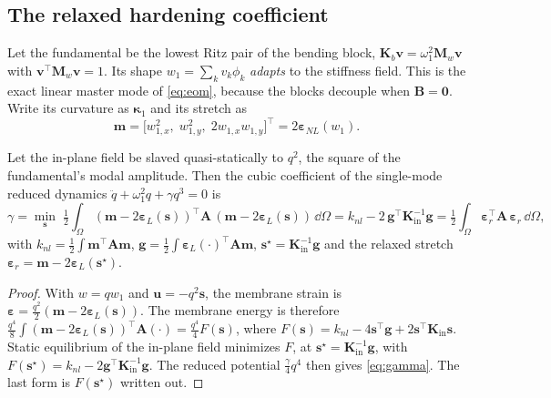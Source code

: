 \subsection{The relaxed hardening coefficient}\label{sec:relaxed}
Let the fundamental be the lowest Ritz pair of the bending block,
$\bm K_b\bm v=\omega_1^2\bm M_w\bm v$ with $\bm v^{\!\top}\bm M_w\bm v=1$. Its shape
$w_1=\sum_kv_k\phi_k$ \emph{adapts} to the stiffness field. This is the exact linear
master mode of \eqref{eq:eom}, because the blocks decouple when $\bm B=\bm0$. Write its
curvature as $\bm\kappa_1$ and its stretch as
\begin{equation}
\bm m=\big[w_{1,x}^2,\;w_{1,y}^2,\;2w_{1,x}w_{1,y}\big]^{\!\top}=2\bm\varepsilon_{NL}(w_1).
\end{equation}

\begin{proposition}\label{prop:relaxed}
Let the in-plane field be slaved quasi-statically to $q^2$, the square of the
fundamental's modal amplitude. Then the cubic coefficient of the single-mode reduced
dynamics $\ddot q+\omega_1^2q+\gamma q^3=0$ is
\begin{equation}
\gamma=\min_{\bm s}\;\tfrac12\int_\Omega(\bm m-2\bm\varepsilon_L(\bm s))^{\!\top}\bm A\,
(\bm m-2\bm\varepsilon_L(\bm s))\,\dd\Omega
=k_{nl}-2\,\bm g^{\!\top}\bm K_{\mathrm{in}}^{-1}\bm g
=\tfrac12\int_\Omega\bm\varepsilon_r^{\!\top}\bm A\,\bm\varepsilon_r\,\dd\Omega,
\label{eq:gamma}
\end{equation}
with $k_{nl}=\tfrac12\int\bm m^{\!\top}\bm A\bm m$,
$\bm g=\tfrac12\int\bm\varepsilon_L(\cdot)^{\!\top}\bm A\bm m$,
$\bm s^\star=\bm K_{\mathrm{in}}^{-1}\bm g$ and the relaxed stretch
$\bm\varepsilon_r=\bm m-2\bm\varepsilon_L(\bm s^\star)$.
\end{proposition}
\begin{proof}
With $w=qw_1$ and $\bm u=-q^2\bm s$, the membrane strain is
$\bm\varepsilon=\tfrac{q^2}{2}(\bm m-2\bm\varepsilon_L(\bm s))$. The membrane energy is
therefore $\tfrac{q^4}{8}\int(\bm m-2\bm\varepsilon_L(\bm s))^{\!\top}\bm A(\cdot)
=\tfrac{q^4}{4}F(\bm s)$, where $F(\bm s)=k_{nl}-4\bm s^{\!\top}\bm g+2\bm s^{\!\top}
\bm K_{\mathrm{in}}\bm s$. Static equilibrium of the in-plane field minimizes $F$, at
$\bm s^\star=\bm K_{\mathrm{in}}^{-1}\bm g$, with $F(\bm s^\star)=k_{nl}-2\bm g^{\!\top}
\bm K_{\mathrm{in}}^{-1}\bm g$. The reduced potential $\tfrac{\gamma}{4}q^4$ then gives
\eqref{eq:gamma}. The last form is $F(\bm s^\star)$ written out.
\end{proof}

